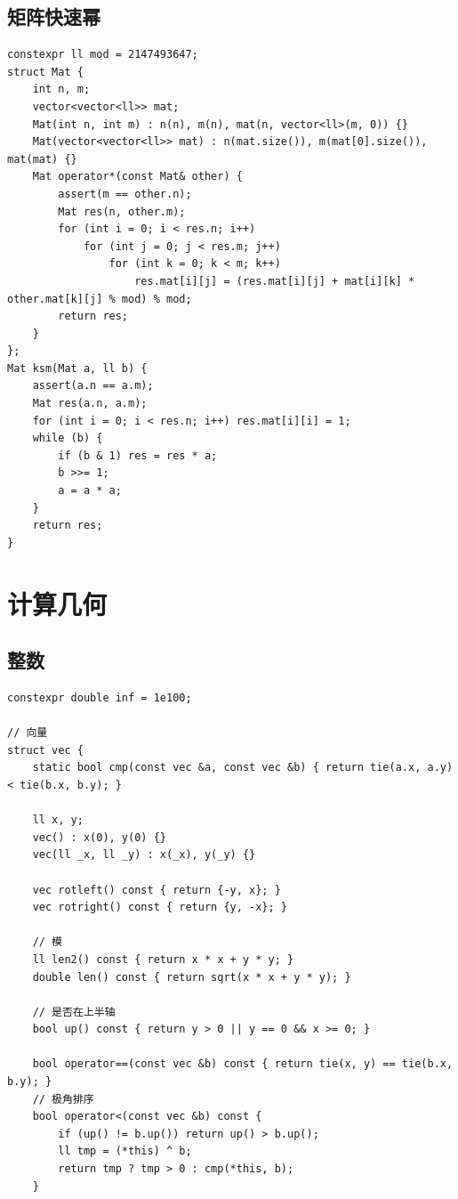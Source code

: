 \documentclass[UTF8, twoside]{ctexart}
\begin{document}
\begin{sloppypar}
\subsection{矩阵快速幂}

\begin{lstlisting}[style=cpp]
constexpr ll mod = 2147493647;
struct Mat {
    int n, m;
    vector<vector<ll>> mat;
    Mat(int n, int m) : n(n), m(n), mat(n, vector<ll>(m, 0)) {}
    Mat(vector<vector<ll>> mat) : n(mat.size()), m(mat[0].size()), mat(mat) {}
    Mat operator*(const Mat& other) {
        assert(m == other.n);
        Mat res(n, other.m);
        for (int i = 0; i < res.n; i++)
            for (int j = 0; j < res.m; j++)
                for (int k = 0; k < m; k++)
                    res.mat[i][j] = (res.mat[i][j] + mat[i][k] * other.mat[k][j] % mod) % mod;
        return res;
    }
};
Mat ksm(Mat a, ll b) {
    assert(a.n == a.m);
    Mat res(a.n, a.m);
    for (int i = 0; i < res.n; i++) res.mat[i][i] = 1;
    while (b) {
        if (b & 1) res = res * a;
        b >>= 1;
        a = a * a;
    }
    return res;
}
\end{lstlisting}

\clearpage

\section{计算几何}

\subsection{整数}

\begin{lstlisting}[style=cpp]
constexpr double inf = 1e100;

// 向量
struct vec {
    static bool cmp(const vec &a, const vec &b) { return tie(a.x, a.y) < tie(b.x, b.y); }

    ll x, y;
    vec() : x(0), y(0) {}
    vec(ll _x, ll _y) : x(_x), y(_y) {}

    vec rotleft() const { return {-y, x}; }
    vec rotright() const { return {y, -x}; }

    // 模
    ll len2() const { return x * x + y * y; }
    double len() const { return sqrt(x * x + y * y); }

    // 是否在上半轴
    bool up() const { return y > 0 || y == 0 && x >= 0; }

    bool operator==(const vec &b) const { return tie(x, y) == tie(b.x, b.y); }
    // 极角排序
    bool operator<(const vec &b) const {
        if (up() != b.up()) return up() > b.up();
        ll tmp = (*this) ^ b;
        return tmp ? tmp > 0 : cmp(*this, b);
    }


\end{lstlisting}
\end{sloppypar}
\end{document}
